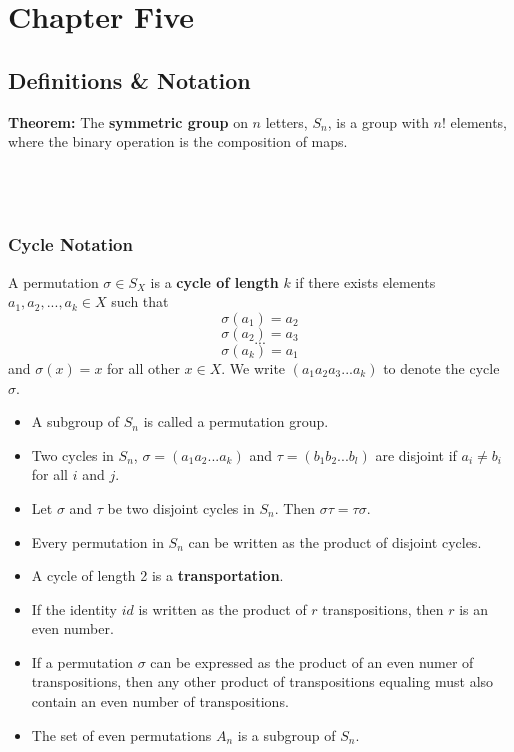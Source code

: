 \documentclass{article}
\begin{document}
\section{Chapter Five}
\subsection{Definitions \& Notation}
\textbf{Theorem:} The \textbf{symmetric group} on $n$ letters, $S_n$, is a group with $n!$ elements, where the binary operation is the composition of maps.
\\\\\\\\
\subsubsection{Cycle Notation}
A permutation $\sigma \in S_X$ is a \textbf{cycle of length} $k$ if there exists elements $a_1, a_2, ..., a_k \in X$ such that
$$\sigma(a_1)=a_2$$
$$\sigma(a_2)=a_3$$
$$...$$
$$\sigma(a_k)=a_1$$
and $\sigma(x)=x$ for all other $x\in X$. We write $(a_1 a_2 a_3 ... a_k)$ to denote the cycle $\sigma$.
\begin{itemize}
    \item A subgroup of $S_n$ is called a permutation group.
    \item Two cycles in $S_n$, $\sigma=(a_1 a_2 ... a_k)$ and $\tau=(b_1 b_2 ... b_l)$ are disjoint if $a_i \neq b_i$ for all $i$ and $j$.
    \item Let $\sigma$ and $\tau$ be two disjoint cycles in $S_n$. Then $\sigma\tau=\tau\sigma$.
    \item Every permutation in $S_n$ can be written as the product of disjoint cycles. 
    \item A cycle of length 2 is a \textbf{transportation}.
    \item If the identity $id$ is written as the product of $r$ transpositions, then $r$ is an even number.
    \item If a permutation $\sigma$ can be expressed as the product of an even numer of transpositions, then any other product of transpositions equaling must also contain an even number of transpositions.
    \item The set of even permutations $A_n$ is a subgroup of $S_n$.
\end{itemize}
\end{document}

